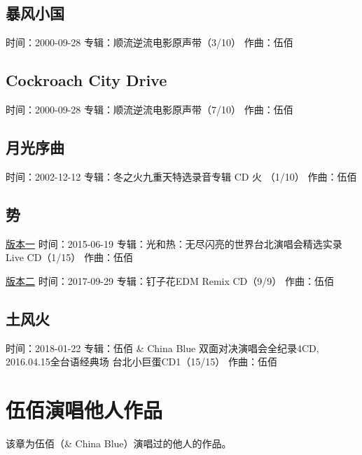 \documentclass[UTF8,a4paper,oneside,twocolumn,12pt]{ctexbook}
\newcommand{\infopair}[2]{\textbullet #1：#2}
\newcommand{\zq}[1][伍佰]{\infopair{作曲}{#1}}
\newcommand{\zj}[1]{\infopair{专辑}{#1}}
\newcommand{\sj}[1]{\infopair{时间}{#1}}
\newenvironment{info}{\begin{flushleft}\kaishu
	}
	{\end{flushleft}\normalsize\yahei\par}
\begin{document}
\section{暴风小国}
\begin{info}
	\sj{2000-09-28}
	\zj{顺流逆流电影原声带（3/10）}
	\zq
\end{info}

\section{Cockroach City Drive}
\begin{info}
	\sj{2000-09-28}
	\zj{顺流逆流电影原声带（7/10）}
	\zq
\end{info}

\section{月光序曲}
\begin{info}
	\sj{2002-12-12}
	\zj{冬之火九重天特选录音专辑 CD 火 （1/10）}
	\zq
\end{info}

\section{势}
\begin{info}
	\underline{版本一}
	\sj{2015-06-19}
	\zj{光和热：无尽闪亮的世界台北演唱会精选实录Live CD（1/15）}
	\zq
\end{info}

\begin{info}
	\underline{版本二}
	\sj{2017-09-29}
	\zj{钉子花EDM Remix CD（9/9）}
	\zq
\end{info}

\section{土风火}
\begin{info}
	\sj{2018-01-22}
	\zj{伍佰 \& China Blue 双面对决演唱会全纪录4CD,
		2016.04.15全台语经典场 台北小巨蛋CD1（15/15）}
	\zq
\end{info}

\chapter{伍佰演唱他人作品}
该章为伍佰（\& China Blue）演唱过的他人的作品。
\end{document}
